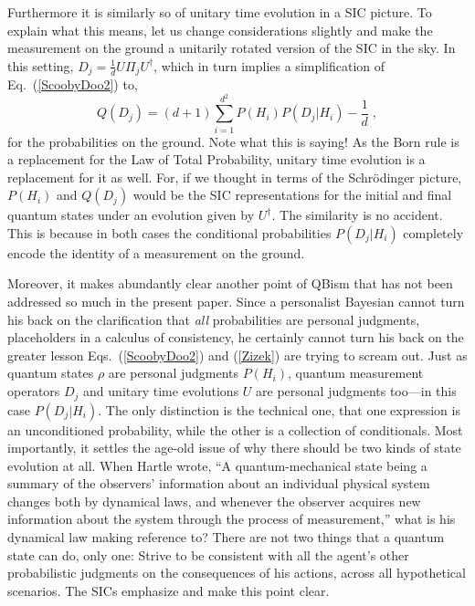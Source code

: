 \documentclass[aps,pra,superscriptaddress,10pt,tightenlines,twocolumn,nofootinbib]{revtex4}
\begin{document}
Furthermore it is similarly so of unitary time evolution in a SIC picture.  To explain what this means, let us change considerations slightly and make the measurement on the ground a unitarily rotated version of the SIC in the sky.  In this setting, $D_j=\frac{1}{d}U\Pi_j U^\dagger$, which in turn implies a simplification of Eq.~(\ref{ScoobyDoo2}) to,
\begin{equation}
Q(D_j) = (d+1)\sum_{i=1}^{d^2} P(H_i) P(D_j|H_i) - \frac{1}{d}\;,
\label{Zizek}
\end{equation}
for the probabilities on the ground.  Note what this is saying!  As the Born rule is a replacement for the Law of Total Probability, unitary time evolution is a replacement for it as well.  For, if we thought in terms of the Schr\"odinger picture, $P(H_i)$ and $Q(D_j)$ would be the SIC representations for the initial and final quantum states under an evolution given by $U^\dagger$. The similarity is no accident.  This is because in both cases the conditional probabilities $P(D_j|H_i)$ completely encode the identity of a measurement on the ground.

Moreover, it makes abundantly clear another point of QBism that has not been addressed so much in the present paper.  Since a personalist Bayesian cannot turn his back on the clarification that {\it all\/} probabilities are personal judgments, placeholders in a calculus of consistency, he certainly cannot turn his back on the greater lesson Eqs.~(\ref{ScoobyDoo2}) and (\ref{Zizek}) are trying to scream out.   Just as quantum states $\rho$ are personal judgments $P(H_i)$, quantum measurement operators $D_j$ and unitary time evolutions $U$ are personal judgments too---in this case $P(D_j|H_i)$.  The only distinction is the technical one, that one expression is an unconditioned probability, while the other is a collection of conditionals.  Most importantly, it settles the age-old issue of why there should be two kinds of state evolution at all.  When Hartle wrote, ``A quantum-mechanical state being a summary of the observers' information about an individual physical system changes both by dynamical laws, and whenever the observer acquires new information about the system through the process of measurement,'' what is his dynamical law making reference to?  There are not two things that a quantum state can do, only one:  Strive to be consistent with all the agent's other probabilistic judgments on the consequences of his actions, across all hypothetical scenarios.  The SICs emphasize and make this point clear.
\end{document}
